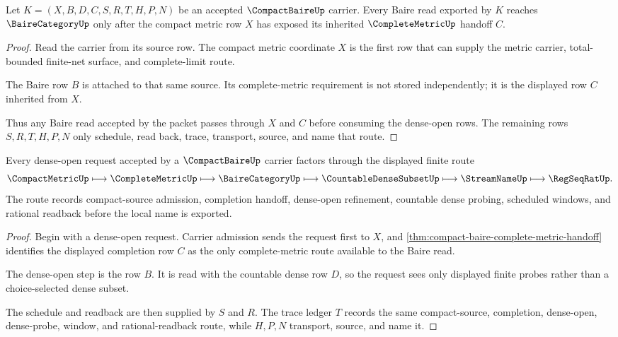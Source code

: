 \begin{theorem}
\label{thm:compact-baire-complete-metric-handoff}
Let $K=(X,B,D,C,S,R,T,H,P,N)$ be an accepted $\CompactBaireUp$ carrier. Every Baire read exported by $K$ reaches $\BaireCategoryUp$ only after the compact metric row $X$ has exposed its inherited $\CompleteMetricUp$ handoff $C$.
\end{theorem}
\begin{proof}
Read the carrier from its source row. The compact metric coordinate $X$ is the first row that can supply the metric carrier, total-bounded finite-net surface, and complete-limit route.

The Baire row $B$ is attached to that same source. Its complete-metric requirement is not stored independently; it is the displayed row $C$ inherited from $X$.

Thus any Baire read accepted by the packet passes through $X$ and $C$ before consuming the dense-open rows. The remaining rows $S,R,T,H,P,N$ only schedule, read back, trace, transport, source, and name that route.
\end{proof}

\begin{theorem}
\label{thm:compact-baire-dense-open-finite-route}
Every dense-open request accepted by a $\CompactBaireUp$ carrier factors through the displayed finite route
$$
\CompactMetricUp \longmapsto \CompleteMetricUp \longmapsto \BaireCategoryUp \longmapsto \CountableDenseSubsetUp \longmapsto \StreamNameUp \longmapsto \RegSeqRatUp .
$$
The route records compact-source admission, completion handoff, dense-open refinement, countable dense probing, scheduled windows, and rational readback before the local name is exported.
\end{theorem}
\begin{proof}
Begin with a dense-open request. Carrier admission sends the request first to $X$, and \autoref{thm:compact-baire-complete-metric-handoff} identifies the displayed completion row $C$ as the only complete-metric route available to the Baire read.

The dense-open step is the row $B$. It is read with the countable dense row $D$, so the request sees only displayed finite probes rather than a choice-selected dense subset.

The schedule and readback are then supplied by $S$ and $R$. The trace ledger $T$ records the same compact-source, completion, dense-open, dense-probe, window, and rational-readback route, while $H,P,N$ transport, source, and name it.
\end{proof}

